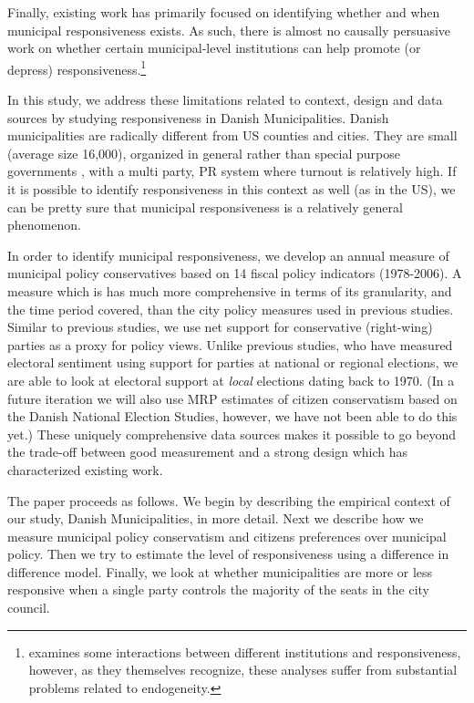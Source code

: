 \documentclass[a4paper,12pt]{article}
\begin{document}
Finally, existing work has primarily focused on identifying whether and when municipal responsiveness exists. As such, there is almost no causally persuasive work on whether certain municipal-level institutions can help promote (or depress) responsiveness.\footnote{\cite{tausanovitch2014representation} examines some interactions between different institutions and responsiveness, however, as they themselves recognize, these analyses suffer from substantial problems related to endogeneity.} 

In this study, we address these limitations related to context, design and data sources by studying responsiveness in Danish Municipalities. Danish municipalities are radically different from US counties and cities. They are small (average size 16,000), organized in general rather than special purpose governments \citep{berry2009imperfect}, with a multi party, PR system where turnout is relatively high. If it is possible to identify responsiveness in this context as well (as in the US), we can be pretty sure that municipal responsiveness is a relatively general phenomenon.

In order to identify municipal responsiveness, we develop an annual measure of municipal policy conservatives based on 14 fiscal policy indicators (1978-2006). A measure which is has much more comprehensive in terms of its granularity, and the time period covered, than the city policy measures used in previous studies. Similar to previous studies, we use net support for conservative (right-wing) parties as a proxy for policy views. Unlike previous studies, who have measured electoral sentiment using support for parties at national or regional elections, we are able to look at electoral support at \textit{local} elections dating back to 1970. (In a future iteration we will also use MRP estimates of citizen conservatism based on the Danish National Election Studies, however, we have not been able to do this yet.) These uniquely comprehensive data sources makes it possible to go beyond the trade-off between good measurement and a strong design which has characterized existing work. 

The paper proceeds as follows. We begin by describing the empirical context of our study, Danish Municipalities, in more detail. Next we describe how we measure municipal policy conservatism and citizens preferences over municipal policy. Then we try to estimate the level of responsiveness using a difference in difference model. Finally, we look at whether municipalities are more or less responsive when a single party controls the majority of the seats in the city council.
\end{document}
